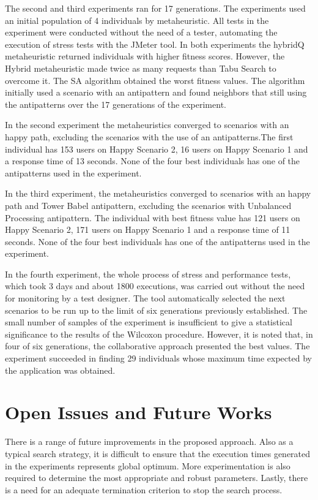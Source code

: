 \documentclass[espaco=umemeio,chapter=TITLE,twoside,openright]{abnt}
\begin{document}
The second and third experiments ran for 17 generations. The experiments used an initial population of 4 individuals by metaheuristic. All tests in the experiment were conducted without the need of a tester, automating the execution of stress tests with the JMeter tool. In both experiments the hybridQ metaheuristic returned individuals with higher fitness scores. However, the Hybrid metaheuristic made twice as many requests than Tabu Search to overcome it. The SA algorithm obtained the worst fitness values. The algorithm initially used a scenario with an antipattern and found neighbors that still using the antipatterns over the 17 generations of the experiment.

In the second experiment the metaheuristics converged to scenarios with an happy path, excluding the scenarios with the use of an antipatterns.The first individual has 153 users on Happy Scenario 2, 16 users on Happy Scenario 1 and a response time of 13 seconds. None of the four best individuals has one of the antipatterns used in the experiment.


In the third experiment,  the metaheuristics converged to scenarios with an happy path and Tower Babel antipattern, excluding the scenarios with Unbalanced Processing antipattern.  The individual with best fitness value has 121 users on Happy Scenario 2, 171 users on Happy Scenario 1 and a response time of 11 seconds. None of the four best individuals has one of the antipatterns used in the experiment.


In the fourth experiment, the whole process of stress and performance tests, which took 3 days and about 1800 executions, was carried out without the need for monitoring by a test designer. The tool automatically selected the next scenarios to be run up to the limit of six generations previously established. The small number of samples of the experiment is insufficient to give a statistical significance to the results of the Wilcoxon procedure. However, it is noted that, in four of six generations, the collaborative approach presented the best values. The experiment succeeded in finding 29 individuals whose maximum time expected by the application was obtained.

\section{Open Issues and Future Works}

There is a range of future improvements in the proposed approach. Also as a typical search strategy, it is difficult to ensure that the execution times generated in the experiments represents global optimum. More experimentation is also required to determine the
most appropriate and robust parameters. Lastly, there is a need for an adequate termination criterion to stop the search process.
\end{document}
